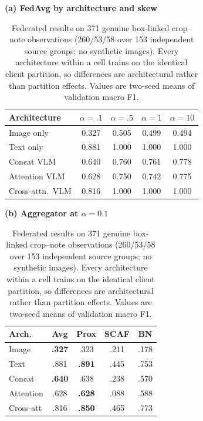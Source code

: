 
\begin{table}[t]
\caption{Federated results on 371 genuine box-linked crop--note observations
(260/53/58 over 153 independent source groups; no synthetic images). Every
architecture within a cell trains on the identical client partition, so
differences are architectural rather than partition effects. Values are
two-seed means of validation macro F1.}
\label{tab:standard_suite}
\centering\scriptsize
\setlength\tabcolsep{2.7pt}
\begin{minipage}[t]{0.38\textwidth}
\centering
\textbf{(a) FedAvg by architecture and skew}
\begin{tabular}{lcccc}
\toprule
Architecture & $\alpha{=}.1$ & $\alpha{=}.5$ & $\alpha{=}1$ & $\alpha{=}10$\\
\midrule
Image only        & 0.327 & 0.505 & 0.499 & 0.494\\
Text only         & 0.881 & 1.000 & 1.000 & 1.000\\
Concat VLM        & 0.640 & 0.760 & 0.761 & 0.778\\
Attention VLM     & 0.628 & 0.750 & 0.742 & 0.775\\
Cross-attn.\ VLM  & 0.816 & 1.000 & 1.000 & 1.000\\
\bottomrule
\end{tabular}
\end{minipage}\hfill
\begin{minipage}[t]{0.30\textwidth}
\centering
\textbf{(b) Aggregator at $\alpha{=}0.1$}
\begin{tabular}{lcccc}
\toprule
Arch. & Avg & Prox & SCAF & BN\\
\midrule
Image     & \textbf{.327} & .323 & .211 & .178\\
Text      & .881 & \textbf{.891} & .445 & .753\\
Concat    & \textbf{.640} & .638 & .238 & .570\\
Attention & .628 & \textbf{.628} & .088 & .588\\
Cross-att & .816 & \textbf{.850} & .465 & .773\\

\end{tabular}
\end{minipage}
\end{table}
